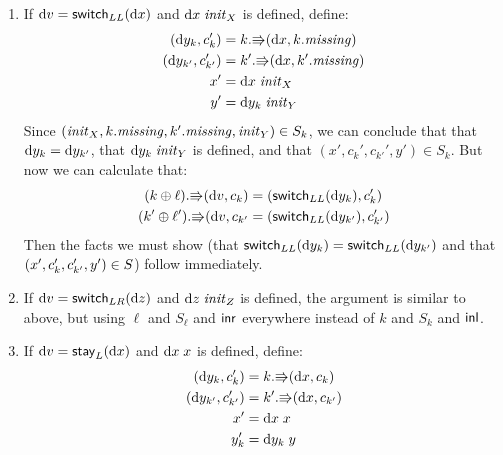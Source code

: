 \begin{pf}
\begin{itemize}
            \begin{enumerate}
                \item If $\textrm{d} v=\mathsf{switch}_{LL}(\textrm{d} x)$ and $\textrm{d} x\;\mathit{init}_X$ is
                    defined, define:
                    \begin{align*}
                        (\textrm{d} y_k,c_k') &= k.\mathord{\Rrightarrow}(\textrm{d} x,k.\mathit{missing}) \\
                        (\textrm{d} y_{k'},c_{k'}') &= k'.\mathord{\Rrightarrow}(\textrm{d} x,k'.\mathit{missing}) \\
                        x' &= \textrm{d} x\;\mathit{init}_X \\
                        y' &= \textrm{d} y_k\;\mathit{init}_Y
                    \end{align*}
                    Since $(\mathit{init}_X,k.\mathit{missing},k'.\mathit{missing},\mathit{init}_Y) \in
                    S_k$, we can conclude that that $\textrm{d} y_k=\textrm{d} y_{k'}$, that
                    $\textrm{d} y_k\;\mathit{init}_Y$ is defined, and that
                    $(x',c_k',c_{k'}',y') \in S_k$. But now we can calculate
                    that:
                    \begin{align*}
                        (k\oplus\ell).\mathord{\Rrightarrow}(\textrm{d} v,{c_k}) &=
                        (\mathsf{switch}_{LL}(\textrm{d} y_k),{c_k'}) \\
                        (k'\oplus\ell').\mathord{\Rrightarrow}(\textrm{d} v,{c_{k'}} &=
                        (\mathsf{switch}_{LL}(\textrm{d} y_{k'}),{c_{k'}'})
                    \end{align*}
                    Then the facts we must show (that
                    $\mathsf{switch}_{LL}(\textrm{d} y_k)=\mathsf{switch}_{LL}(\textrm{d} y_{k'})$ and
                    that
                    $({x'},{c_k'},{c_{k'}'},{y'})
                    \in S$) follow immediately.
                \item If $\textrm{d} v=\mathsf{switch}_{LR}(\textrm{d} z)$ and $\textrm{d} z\;\mathit{init}_Z$ is
                    defined, the argument is similar to above, but using
                    $\ell$ and $S_\ell$ and $\mathsf{inr}$ everywhere instead of
                    $k$ and $S_k$ and $\mathsf{inl}$.
                \item If $\textrm{d} v=\mathsf{stay}_L(\textrm{d} x)$ and $\textrm{d} x\;x$ is defined,
                    define:
                    \begin{align*}
                        (\dy_k,c_k') &= k.\dputr(\dx,c_k) \\
                        (\dy_{k'},c_{k'}') &= k'.\dputr(\dx,c_{k'}) \\
                        x' &= \dx\;x \\
                        y_k' &= \dy_k\;y \\

\end{align*}
\end{enumerate}
\end{itemize}
\end{pf}
